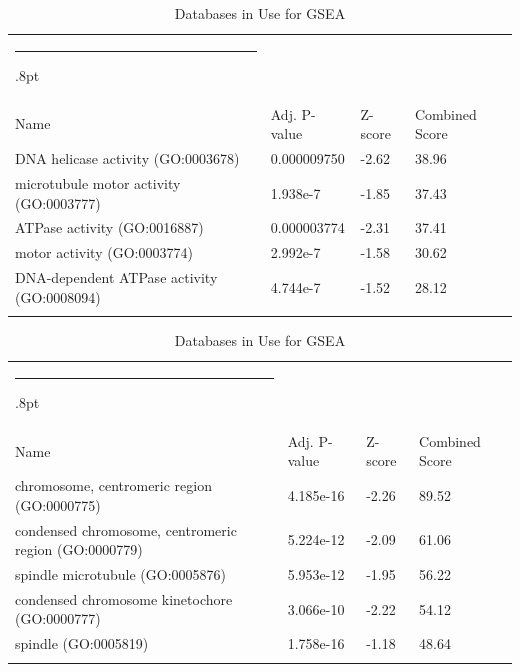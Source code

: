 \documentclass[3p,authoryear,preprint,12pt]{elsarticle}
\makeatletter
\def\hlinewd#1{%
  \noalign{\ifnum0=`}\fi\hrule \@height #1%
  \futurelet\reserved@a\@xhline}
\def\tbltoprule{\hlinewd{.8pt}\\[-12pt]}
\def\tblbottomrule{\noalign{\vspace*{6pt}}\hline\noalign{\vspace*{2pt}}}
\def\tblmidrule{\noalign{\vspace*{6pt}}\hline\noalign{\vspace*{2pt}}}
\makeatother
\begin{document}
\begin{table}[!htbp]
	\caption{{Databases in Use for GSEA} }
	\label{tw-de478ae31cc6}
	\def\arraystretch{1}
	\ignorespaces 
	\centering 
	\begin{tabulary}{\linewidth}{p{\dimexpr.65\tabcolsep}p{\dimexpr.15\tabcolsep}p{\dimexpr.1\tabcolsep}p{\dimexpr.1\tabcolsep}}
		\tbltoprule Name & Adj. P-value & Z-score & Combined Score\\
		\tblmidrule
DNA helicase activity (GO:0003678) & 0.000009750 & -2.62 & 38.96 \\
microtubule motor activity (GO:0003777) & 1.938e-7 & -1.85 & 37.43 \\
ATPase activity (GO:0016887) & 0.000003774 & -2.31 & 37.41 \\
motor activity (GO:0003774) & 2.992e-7 & -1.58 & 30.62 \\
DNA-dependent ATPase activity (GO:0008094) & 4.744e-7 & -1.52 & 28.12 \\
		\tblbottomrule
	\end{tabulary}\par 
\end{table}
\begin{table}[!htbp]
	\caption{{Databases in Use for GSEA} }
	\label{tw-de478ae31cc6}
	\def\arraystretch{1}
	\ignorespaces 
	\centering 
	\begin{tabulary}{\linewidth}{p{\dimexpr.65\tabcolsep}p{\dimexpr.15\tabcolsep}p{\dimexpr.1\tabcolsep}p{\dimexpr.1\tabcolsep}}
		\tbltoprule Name & Adj. P-value & Z-score & Combined Score\\
		\tblmidrule
chromosome, centromeric region (GO:0000775) & 4.185e-16 & -2.26 & 89.52 \\
condensed chromosome, centromeric region (GO:0000779) & 5.224e-12 & -2.09 & 61.06 \\
spindle microtubule (GO:0005876) & 5.953e-12 & -1.95 & 56.22 \\
condensed chromosome kinetochore (GO:0000777) & 3.066e-10 & -2.22 & 54.12 \\
spindle (GO:0005819) & 1.758e-16 & -1.18 & 48.64 \\
		\tblbottomrule
	\end{tabulary}\par 
\end{table}
\end{document}
